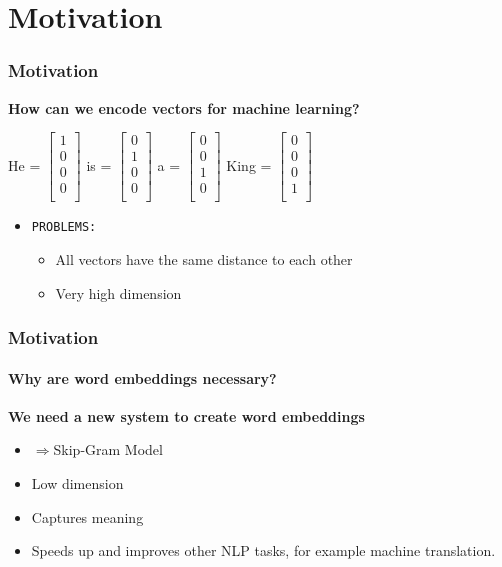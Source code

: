 
\section{Motivation}
\begin{frame}\frametitle{Motivation}
\textbf{How can we encode vectors for machine learning? }\\
\bigskip 
\centerline{
He = 
$
\begin{bmatrix}
1\\
0\\
0\\
0\\
\end{bmatrix}
$
is = $
\begin{bmatrix}
0\\
1\\
0\\
0\\
\end{bmatrix}
$
a = $
\begin{bmatrix}
0\\
0\\
1\\
0\\
\end{bmatrix}
$
King =
$
\begin{bmatrix}
0\\
0\\
0\\
1\\
\end{bmatrix}
$}
\bigskip
\begin{itemize}
    \item \texttt{PROBLEMS:}
    \begin{itemize}
    \item All vectors have the same distance to each other
    \item Very high dimension 
    \end{itemize}
\end{itemize}
\end{frame}
\begin{frame}\frametitle {Motivation}
    \framesubtitle{Why are word embeddings necessary?}
    \textbf{We need a new system to create word embeddings }
      \begin{itemize}
 \item $\Rightarrow $Skip-Gram Model
 \item Low dimension
 \item Captures meaning
 \item Speeds up and improves other NLP tasks, for example machine translation. 
 \end{itemize}
  \end{frame}
